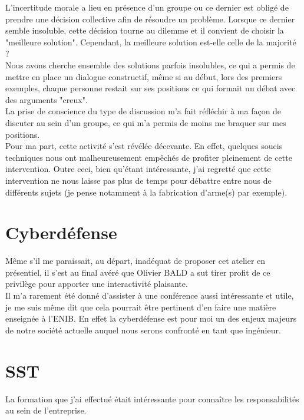 {L'incertitude morale a lieu en présence d'un groupe ou ce dernier est obligé de prendre une décision collective afin de résoudre un problème. Lorsque ce dernier semble insoluble, cette décision tourne au dilemme et il convient de choisir la "meilleure solution".
Cependant, la meilleure solution est-elle celle de la majorité ?\\

Nous avons cherche ensemble des solutions parfois insolubles, ce qui a permis de mettre en place un dialogue constructif, même si au début, lors des premiers exemples, chaque personne restait sur ses positions ce qui formait un débat avec des arguments "creux".\\

La prise de conscience du type de discussion m'a fait réfléchir à ma façon de discuter au sein d'un groupe, ce qui m'a permis de moins me braquer sur mes positions.\\


Pour ma part, cette activité s'est révélée décevante. En effet, quelques soucis techniques nous ont malheureusement empêchés de profiter pleinement de cette intervention. Outre ceci, bien qu'étant intéressante, j'ai regretté que cette intervention ne nous laisse pas plus de temps pour débattre entre nous de différents sujets (je pense notamment à la fabrication d'arme(s) par exemple).

\section{Cyberdéfense}

Même s'il me paraissait, au départ, inadéquat de proposer cet atelier en présentiel, il s'est au final avéré que Olivier BALD a sut tirer profit de ce privilège pour apporter une interactivité plaisante.\\
Il m'a rarement été donné d'assister à une conférence aussi intéressante et utile, je me suis même dit que cela pourrait être pertinent d'en faire une matière enseignée à l'ENIB. En effet la cyberdéfense est pour moi un des enjeux majeurs de notre société actuelle auquel nous serons confronté en tant que ingénieur.



\section{SST}


La formation que j'ai effectué était intéressante pour connaître les responsabilités au sein de l'entreprise. 

}
